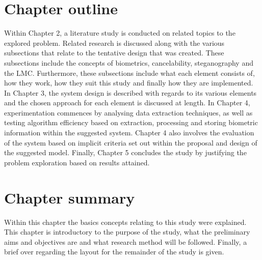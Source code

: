\section{Chapter outline}  %
\label{section1.6}
Within Chapter 2, a literature study is conducted on related topics to the explored problem. Related research is discussed along with the various subsections that relate to the tentative design that was created. These subsections include the concepts of biometrics, cancelability, steganography and the LMC. Furthermore, these subsections include what each element consists of, how they work, how they suit this study and finally how they are implemented.
In Chapter 3, the system design is described with regards to its various elements and the chosen approach for each element is discussed at length.
In Chapter 4, experimentation commences by analysing data extraction techniques, as well as testing algorithm efficiency based on extraction, processing and storing biometric information within the suggested system. Chapter 4 also involves the evaluation of the system based on implicit criteria set out within the proposal and design of the suggested model.
Finally, Chapter 5 concludes the study by justifying the problem exploration based on results attained.

\section{Chapter summary}
\label{section1.7}
Within this chapter the basics concepts relating to this study were explained. This chapter is introductory to the purpose of the study, what the preliminary aims and objectives are and what research method will be followed. Finally, a brief over regarding the layout for the remainder of the study is given.
